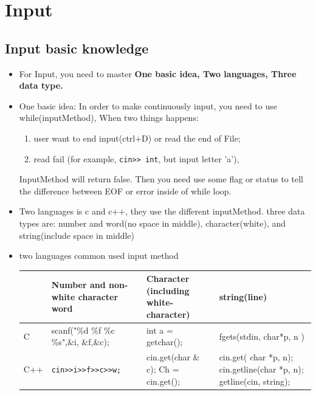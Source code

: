 \documentclass[a4paper,12pt,twoside]{book}
\begin{document}
\section{Input}

\subsection{Input basic knowledge}

\begin{itemize}
	\item For Input, you need to master \textbf{One basic idea, Two languages, Three data type.}
	\item One basic idea: In order to make continuously input, you need to use while(inputMethod), When two things happens:
	\begin{enumerate}
		\item user want to end input(ctrl+D) or read the end of File;
		\item read fail (for example,  \texttt{cin>> int}, but input letter 'a'),
	\end{enumerate}
	
	InputMethod will return false.  Then you need use some flag or status to tell the difference between EOF or error inside of while loop.
	
	\item Two languages is c and c++, they use the different inputMethod. three data types are: number and word(no space in middle), character(white), and string(include space in middle)
	
	\item two languages common used input method \\
	\begin{tabular}{|p{}|p{}|p{}|p{}|}
		\hline
		& Number and non-white  character word & Character (including white-character) & string(line)\\
		\hline
		C &scanf("\%d \%f \%c \%s",\&i, \&f,\&c);  & int a = getchar(); & fgets(stdin, char*p, n ) \\
		\hline
		C++ & \texttt{cin>>i>>f>>c>>w;} & cin.get(char \& c); \newline  Ch = cin.get(); & cin.get( char *p, n); \newline cin.getline(char *p, n); \newline getline(cin, string);
		\\
		\hline
	\end{tabular}
	

\end{itemize}
\end{document}
